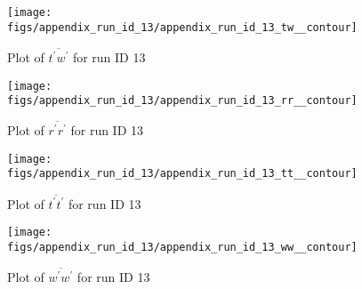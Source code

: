\begin{figure}[H]
\centering
\texttt{[image: figs/appendix\_run\_id\_13/appendix\_run\_id\_13\_tw\_\_contour]}
\caption{Plot of $\overline{t^\prime w^\prime}$ for run ID 13}
\label{fig:appendix_run_id_13_tw__contour}
\end{figure}


\begin{figure}[H]
\centering
\texttt{[image: figs/appendix\_run\_id\_13/appendix\_run\_id\_13\_rr\_\_contour]}
\caption{Plot of $\overline{r^\prime r^\prime}$ for run ID 13}
\label{fig:appendix_run_id_13_rr__contour}
\end{figure}


\begin{figure}[H]
\centering
\texttt{[image: figs/appendix\_run\_id\_13/appendix\_run\_id\_13\_tt\_\_contour]}
\caption{Plot of $\overline{t^\prime t^\prime}$ for run ID 13}
\label{fig:appendix_run_id_13_tt__contour}
\end{figure}


\begin{figure}[H]
\centering
\texttt{[image: figs/appendix\_run\_id\_13/appendix\_run\_id\_13\_ww\_\_contour]}
\caption{Plot of $\overline{w^\prime w^\prime}$ for run ID 13}
\label{fig:appendix_run_id_13_ww__contour}
\end{figure}


